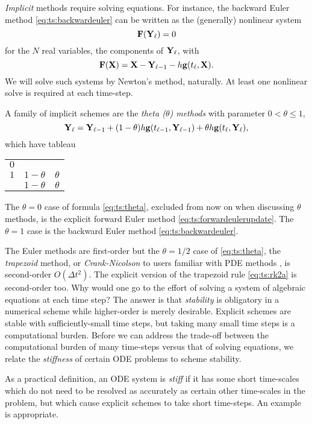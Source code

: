 \emph{Implicit} methods require solving equations.  For instance, the backward Euler method \eqref{eq:ts:backwardeuler} can be written as the (generally) nonlinear system
    $$\mathbf{F}(\mathbf{Y}_\ell)=0$$
for the $N$ real variables, the components of $\mathbf{Y}_\ell$, with
    $$\mathbf{F}(\mathbf{X}) = \mathbf{X} - \mathbf{Y}_{\ell-1} - h \mathbf{g}(t_\ell,\mathbf{X}).$$
We will solve such systems by Newton's method, naturally.  At least one nonlinear solve is required at each time-step.

A family of implicit schemes are the \emph{theta ($\theta$) methods} with parameter $0<\theta\le 1$,
\begin{equation}
\mathbf{Y}_\ell = \mathbf{Y}_{\ell-1} + (1-\theta) h \mathbf{g}(t_{\ell-1},\mathbf{Y}_{\ell-1}) + \theta h \mathbf{g}(t_\ell,\mathbf{Y}_{\ell}),  \label{eq:ts:theta}
\end{equation}
which have tableau
\begin{center}
\begin{tabular}{c|cc}
$0$   \\
$1$ & $1-\theta$ & $\theta$ \\ \hline
    & $1-\theta$ & $\theta$
\end{tabular}
\end{center}
The $\theta=0$ case of formula \eqref{eq:ts:theta}, excluded from now on when discussing $\theta$ methods, is the explicit forward Euler method \eqref{eq:ts:forwardeulerupdate}.  The $\theta=1$ case is the backward Euler method \eqref{eq:ts:backwardeuler}.

The Euler methods are first-order but the $\theta=1/2$ case of \eqref{eq:ts:theta}, the \emph{trapezoid} method, or \emph{Crank-Nicolson} to users familiar with PDE methods \citep{MortonMayers2005}, is second-order $O(\Delta t^2)$.  The explicit version of the trapezoid rule \eqref{eq:ts:rk2a} is second-order too.  Why would one go to the effort of solving a system of algebraic equations at each time step?  The answer is that \emph{stability} is obligatory in a numerical scheme while higher-order is merely desirable.  Explicit schemes are stable with sufficiently-small time steps, but taking many small time steps is a computational burden.  Before we can address the trade-off between the computational burden of many time-steps versus that of solving equations, we relate the \emph{stiffness} of certain ODE problems to scheme stability.

As a practical definition, an ODE system is \emph{stiff} if it has some short time-scales which do not need to be resolved as accurately as certain other time-scales in the problem, but which cause explicit schemes to take short time-steps.  An example is appropriate.

